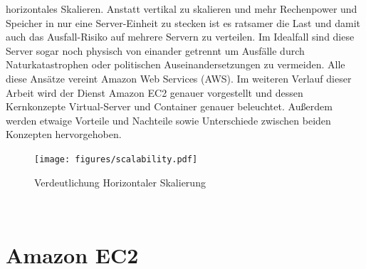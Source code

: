 \documentclass[titlepage]{report}
\begin{document}
horizontales Skalieren. Anstatt vertikal zu skalieren und mehr
Rechenpower und Speicher in nur eine Server\hyp{}Einheit zu stecken ist es
ratsamer die Last und damit auch das Ausfall\hyp{}Risiko auf mehrere Servern
zu verteilen. Im Idealfall sind diese Server sogar noch physisch von
einander getrennt um Ausfälle durch Naturkatastrophen oder politischen
Auseinandersetzungen zu vermeiden.  Alle diese Ansätze vereint Amazon
Web Services (AWS). Im weiteren Verlauf dieser Arbeit wird der Dienst
Amazon EC2 genauer vorgestellt und dessen Kernkonzepte Virtual\hyp{}Server
und Container genauer beleuchtet. Außerdem werden etwaige Vorteile und
Nachteile sowie Unterschiede zwischen beiden Konzepten hervorgehoben.
\begin{figure}[h]
    \centering
    \texttt{[image: figures/scalability.pdf]}
    \caption{Verdeutlichung Horizontaler Skalierung}\label{fig:1}
\end{figure}
\\
\chapter*{Amazon EC2}
\end{document}
